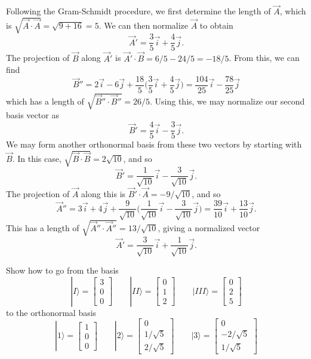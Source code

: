 \documentclass[../principles-of-quantum-mechanics.tex]{subfiles}
\begin{document}
\begin{questions}
\begin{solution}
	Following the Gram-Schmidt procedure, we first determine the length of $\vec{A}$, which is $\sqrt{\vec{A}\cdot\vec{A}} = \sqrt{9 + 16} = 5$. We can then normalize $\vec{A}$ to obtain
	\[
		\vec{A}' = \frac{3}{5}\vec{i} + \frac{4}{5}\vec{j}.
	\]
	The projection of $\vec{B}$ along $\vec{A}'$ is $\vec{A}'\cdot\vec{B} = 6/5 - 24/5 = -18/5$. From this, we can find
	\[
		\vec{B}'' = 2\vec{i} - 6\vec{j} + \frac{18}{5}\Big(\frac{3}{5}\vec{i} + \frac{4}{5}\vec{j}\Big) = \frac{104}{25}\vec{i} - \frac{78}{25}\vec{j}
	\]
	which has a length of $\sqrt{\vec{B}''\cdot\vec{B}''} = 26/5$. Using this, we may normalize our second basis vector as
	\[
		\vec{B}' = \frac{4}{5}\vec{i} - \frac{3}{5}\vec{j}.
	\]
	We may form another orthonormal basis from these two vectors by starting with $\vec{B}$. In this case, $\sqrt{\vec{B}\cdot\vec{B}} = 2\sqrt{10}$, and so
	\[
		\vec{B}' = \frac{1}{\sqrt{10}}\vec{i} - \frac{3}{\sqrt{10}}\vec{j}.
	\]
	The projection of $\vec{A}$ along this is $\vec{B}'\cdot\vec{A} = -9/\sqrt{10}$, and so
	\[
		\vec{A}'' = 3\vec{i} + 4\vec{j} + \frac{9}{\sqrt{10}}\Big(\frac{1}{\sqrt{10}}\vec{i} - \frac{3}{\sqrt{10}}\vec{j}\Big) = \frac{39}{10}\vec{i} + \frac{13}{10}\vec{j}.
	\]
	This has a length of $\sqrt{\vec{A}''\cdot\vec{A}''}=13/\sqrt{10}$, giving a normalized vector
	\[
		\vec{A}' = \frac{3}{\sqrt{10}}\vec{i} + \frac{1}{\sqrt{10}}\vec{j}.
	\]
\end{solution}

\question Show how to go from the basis
\[
	|I\rangle = \begin{bmatrix}
		3 \\ 0 \\ 0
	\end{bmatrix} \qquad
	|II\rangle = \begin{bmatrix}
		0 \\ 1 \\ 2
	\end{bmatrix} \qquad
	|III\rangle = \begin{bmatrix}
		0 \\ 2 \\ 5
	\end{bmatrix}
\]
to the orthonormal basis
\[
	|1\rangle = \begin{bmatrix}
	1 \\ 0 \\ 0
	\end{bmatrix} \qquad
	|2\rangle = \begin{bmatrix}
	0 \\ 1/\sqrt{5} \\ 2/\sqrt{5}
	\end{bmatrix} \qquad
	|3\rangle = \begin{bmatrix}
	0 \\ -2/\sqrt{5} \\ 1/\sqrt{5}
	\end{bmatrix}
\]


\end{questions}
\end{document}
